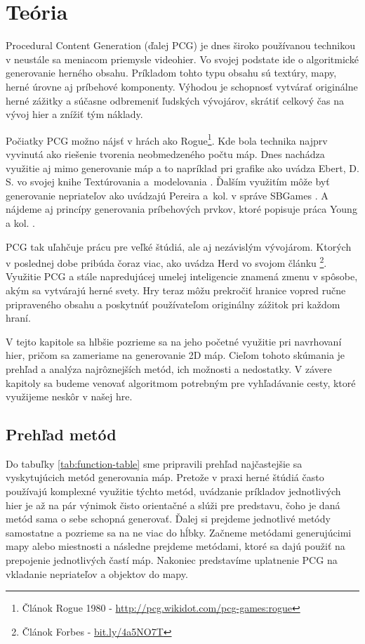 \label{sec:theory}
\chapter{Teória} %

Procedural Content Generation (ďalej PCG) je dnes široko používanou technikou v neustále sa meniacom priemysle videohier. Vo svojej podstate ide o algoritmické generovanie herného obsahu. Príkladom tohto typu obsahu sú textúry, mapy, herné úrovne aj príbehové komponenty. Výhodou je schopnosť vytvárať originálne herné zážitky a súčasne odbremeniť ľudských vývojárov, skrátiť celkový čas na vývoj hier a znížiť tým náklady.

Počiatky PCG možno nájsť v hrách ako Rogue\footnote{Článok Rogue 1980 - \url{http://pcg.wikidot.com/pcg-games:rogue}}. Kde bola technika najprv vyvinutá ako riešenie tvorenia neobmedzeného počtu máp. Dnes nachádza využitie aj mimo generovanie máp a to napríklad pri grafike ako uvádza Ebert, D. S. vo svojej knihe Textúrovania a~modelovania \cite{ebert2003texturing}. Ďalším využitím môže byť generovanie nepriateľov ako uvádzajú Pereira a~kol. v správe SBGames \cite{pereira2021procedural}. A nájdeme aj princípy generovania príbehových prvkov, ktoré popisuje práca Young a kol. \cite{young2013plans}.

PCG tak uľahčuje prácu pre veľké štúdiá, ale aj nezávislým vývojárom. Ktorých v poslednej dobe pribúda čoraz viac, ako uvádza Herd vo svojom článku \footnote{Článok Forbes - \url{bit.ly/4a5NO7T}}. Využitie PCG a stále napredujúcej umelej inteligencie znamená zmenu v spôsobe, akým sa vytvárajú herné svety. Hry teraz môžu prekročiť hranice vopred ručne pripraveného obsahu a poskytnúť používateľom originálny zážitok pri každom hraní.

V tejto kapitole sa hlbšie pozrieme sa na jeho početné využitie pri navrhovaní hier, pričom sa zameriame na generovanie 2D máp. Cieľom tohoto skúmania je prehľad a analýza najrôznejších metód, ich možnosti a nedostatky. V závere kapitoly sa budeme venovať algoritmom potrebným pre vyhľadávanie cesty, ktoré využijeme neskôr v našej hre.

\section{Prehľad metód} 

Do tabuľky \ref{tab:function-table} sme pripravili prehľad najčastejšie sa vyskytujúcich metód generovania máp. Pretože v praxi herné štúdiá často používajú komplexné využitie týchto metód, uvádzanie príkladov jednotlivých hier je až na pár výnimok čisto orientačné a slúži pre predstavu, čoho je daná metód sama o sebe schopná generovať. Ďalej si prejdeme jednotlivé metódy samostatne a pozrieme sa na ne viac do hĺbky. Začneme metódami generujúcimi mapy alebo miestnosti a následne prejdeme metódami, ktoré sa dajú použiť na prepojenie jednotlivých častí máp. Nakoniec predstavíme uplatnenie PCG na vkladanie nepriateľov a objektov do mapy.

